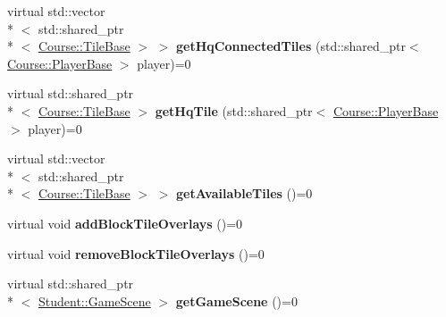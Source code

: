\begin{DoxyCompactItemize}
\item 
\hypertarget{class_course_1_1i_object_manager_aca0de6143427becba38de0147a172519}{virtual std\-::vector\\*
$<$ std\-::shared\-\_\-ptr\\*
$<$ \hyperlink{class_course_1_1_tile_base}{Course\-::\-Tile\-Base} $>$ $>$ {\bfseries get\-Hq\-Connected\-Tiles} (std\-::shared\-\_\-ptr$<$ \hyperlink{class_course_1_1_player_base}{Course\-::\-Player\-Base} $>$ player)=0}\label{class_course_1_1i_object_manager_aca0de6143427becba38de0147a172519}

\item 
\hypertarget{class_course_1_1i_object_manager_af5a8fe59e6d1151ccae54db791c7263c}{virtual std\-::shared\-\_\-ptr\\*
$<$ \hyperlink{class_course_1_1_tile_base}{Course\-::\-Tile\-Base} $>$ {\bfseries get\-Hq\-Tile} (std\-::shared\-\_\-ptr$<$ \hyperlink{class_course_1_1_player_base}{Course\-::\-Player\-Base} $>$ player)=0}\label{class_course_1_1i_object_manager_af5a8fe59e6d1151ccae54db791c7263c}

\item 
\hypertarget{class_course_1_1i_object_manager_ac04e7acf5275e295fb9ed3c99e1e0b9a}{virtual std\-::vector\\*
$<$ std\-::shared\-\_\-ptr\\*
$<$ \hyperlink{class_course_1_1_tile_base}{Course\-::\-Tile\-Base} $>$ $>$ {\bfseries get\-Available\-Tiles} ()=0}\label{class_course_1_1i_object_manager_ac04e7acf5275e295fb9ed3c99e1e0b9a}

\item 
\hypertarget{class_course_1_1i_object_manager_a71208cd63551bb2d59bc19cd91fdfae9}{virtual void {\bfseries add\-Block\-Tile\-Overlays} ()=0}\label{class_course_1_1i_object_manager_a71208cd63551bb2d59bc19cd91fdfae9}

\item 
\hypertarget{class_course_1_1i_object_manager_a8e2ee49acca436aba208a2f9a1d8f6a2}{virtual void {\bfseries remove\-Block\-Tile\-Overlays} ()=0}\label{class_course_1_1i_object_manager_a8e2ee49acca436aba208a2f9a1d8f6a2}

\item 
\hypertarget{class_course_1_1i_object_manager_a42111a8d3471ccf5b63efaf76f4e036c}{virtual std\-::shared\-\_\-ptr\\*
$<$ \hyperlink{class_student_1_1_game_scene}{Student\-::\-Game\-Scene} $>$ {\bfseries get\-Game\-Scene} ()=0}\label{class_course_1_1i_object_manager_a42111a8d3471ccf5b63efaf76f4e036c}


\end{DoxyCompactItemize}
